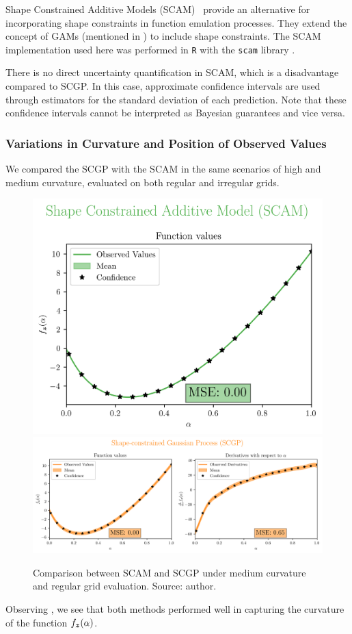 Shape Constrained Additive Models (SCAM)~\cite{Pya2014} provide an alternative for incorporating shape constraints in function emulation processes. They extend the concept of GAMs (mentioned in ) to include shape constraints.
The SCAM implementation used here was performed in \texttt{R} with the \texttt{scam} library \cite{scam2012}.

There is no direct uncertainty quantification in SCAM, which is a disadvantage compared to SCGP. In this case, approximate confidence intervals are used through estimators for the standard deviation of each prediction. Note that these confidence intervals cannot be interpreted as Bayesian guarantees and vice versa.

\subsubsection{Variations in Curvature and Position of Observed Values}

We compared the SCGP with the SCAM in the same scenarios of high and medium curvature, evaluated on both regular and irregular grids.

\begin{figure}[H]
    \centering
    \includegraphics[width=.33\textwidth]{../experiments/uniform_new_MC/SCAM_20_nobs.png}
    \includegraphics[width=.66\textwidth]{../experiments/uniform_new_MC/SCGP_20_nobs.png}
    \caption{ {\small Comparison between SCAM and SCGP under medium curvature and regular grid evaluation. Source: author.}}
    \label{fig:SCAMuniformMC}
\end{figure}

Observing , we see that both methods performed well in capturing the curvature of the function \( f_{\boldsymbol{z}}(\alpha) \).

